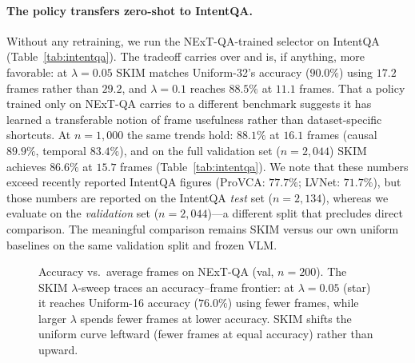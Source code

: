 \documentclass{article}
\begin{document}
\paragraph{The policy transfers zero-shot to IntentQA.}
Without any retraining, we run the NExT-QA-trained selector on IntentQA
(Table~\ref{tab:intentqa}). The tradeoff carries over and is, if anything, more
favorable: at $\lambda{=}0.05$ SKIM matches Uniform-32's accuracy ($90.0\%$) using
$17.2$ frames rather than $29.2$, and $\lambda{=}0.1$ reaches $88.5\%$ at $11.1$ frames.
That a policy trained only on NExT-QA carries to a different benchmark suggests it has
learned a transferable notion of frame usefulness rather than dataset-specific
shortcuts. At $n{=}1{,}000$ the same trends hold: $88.1\%$ at $16.1$ frames (causal $89.9\%$,
temporal $83.4\%$), and on the full validation set ($n{=}2{,}044$) SKIM achieves
$86.6\%$ at $15.7$ frames (Table~\ref{tab:intentqa}). We note that these numbers
exceed recently reported IntentQA figures (ProVCA: $77.7\%$; LVNet: $71.7\%$), but
those numbers are reported on the IntentQA \emph{test} set ($n{=}2{,}134$), whereas
we evaluate on the \emph{validation} set ($n{=}2{,}044$)---a different split that
precludes direct comparison. The meaningful comparison remains SKIM versus our own
uniform baselines on the same validation split and frozen VLM.

\begin{figure}[t]
  \centering
  \caption{Accuracy vs.\ average frames on NExT-QA (val, $n{=}200$). The SKIM
    $\lambda$-sweep traces an accuracy--frame frontier: at $\lambda{=}0.05$ (star) it
    reaches Uniform-16 accuracy ($76.0\%$) using fewer frames, while larger $\lambda$
    spends fewer frames at lower accuracy. SKIM shifts the uniform curve leftward
    (fewer frames at equal accuracy) rather than upward.}
  \label{fig:pareto}
\end{figure}
\end{document}
